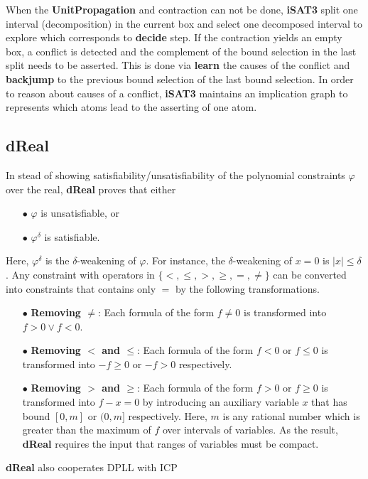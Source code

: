 When the \textbf{UnitPropagation} and contraction can not be done, \textbf{iSAT3} split one interval (decomposition) in the current box and select one decomposed interval to explore which corresponds to \textbf{decide} step. If the contraction yields an empty box, a conflict is detected and the complement of the bound selection in the last split needs to be asserted. This is done via \textbf{learn} the causes of the conflict and \textbf{backjump} to the previous bound selection of the last bound selection. In order to reason about causes of a conflict, \textbf{iSAT3} maintains an implication graph to represents which atoms lead to the asserting of one atom. 
\subsection*{dReal}
In stead of showing satisfiability/unsatisfiability of the polynomial constraints $\varphi$ over the real, \textbf{dReal} proves that either
\begin{itemize}
\item [$\bullet$] $\varphi$ is unsatisfiable, or 
\item [$\bullet$] $\varphi^\delta$ is satisfiable. 
\end{itemize}
Here, $\varphi^\delta$ is the $\delta$-weakening of $\varphi$. For instance, the $\delta$-weakening of $x = 0$ is $|x| \le \delta$. Any constraint with operators in $\{<, \le, > , \ge, =, \not=\}$ can be converted into constraints that contains only $=$ by the following transformations.
\begin{itemize}
\item [$\bullet$] \textbf{Removing $\not=$}: Each formula of the form $f \not= 0$ is transformed into $f > 0 \vee f < 0$.
\item [$\bullet$] \textbf{Removing $<$ and $\le$}: Each formula of the form $f < 0$ or $f \le 0$ is transformed into $-f \ge 0$ or $-f > 0$ respectively.
\item [$\bullet$] \textbf{Removing $>$ and $\ge$}: Each formula of the form $f > 0$ or $f \ge 0$ is transformed into $f - x = 0$ by introducing an auxiliary variable $x$ that has bound $[0, m]$ or $(0, m]$ respectively. Here, $m$ is any rational number which is greater than the maximum of $f$ over intervals of variables. As the result, \textbf{dReal} requires the input that ranges of variables must be compact.
\end{itemize}

\textbf{dReal} also cooperates DPLL with ICP
